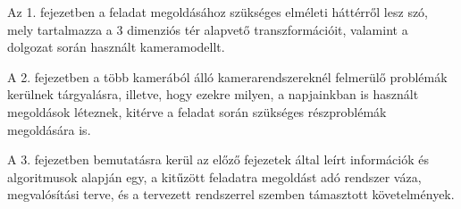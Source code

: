 Az 1. fejezetben a feladat megoldásához szükséges elméleti háttérről lesz szó, mely tartalmazza a 3 dimenziós tér alapvető transzformációit, valamint a dolgozat során használt kameramodellt.

A 2. fejezetben a több kamerából álló kamerarendszereknél felmerülő problémák kerülnek tárgyalásra, illetve, hogy ezekre milyen, a napjainkban is használt megoldások léteznek, kitérve a feladat során szükséges részproblémák megoldására is.

A 3. fejezetben bemutatásra kerül az előző fejezetek által leírt információk és algoritmusok alapján egy, a kitűzött feladatra megoldást adó rendszer váza, megvalósítási terve, és a tervezett rendszerrel szemben támasztott követelmények.
